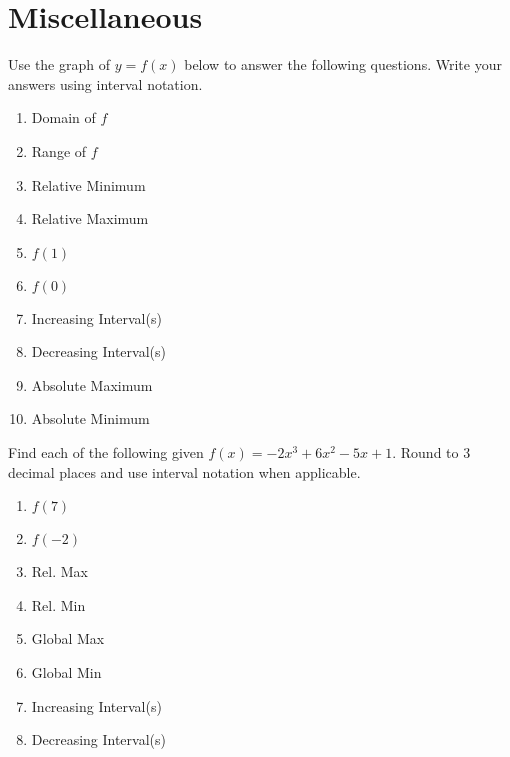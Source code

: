 \section{Miscellaneous}

Use the graph of $y = f(x)$ below to answer the following questions. Write your answers using interval notation.
\begin{center}
\end{center}

\begin{multicols}{2}
\begin{enumerate}
\item Domain of $f$
\item Range of $f$
\item Relative Minimum
\item Relative Maximum
\item $f(1)$
\item $f(0)$
\item Increasing Interval(s)
\item Decreasing Interval(s)
\item Absolute Maximum
\item Absolute Minimum
\setcounter{Review}{\value{enumi}}
\end{enumerate}
\end{multicols}

Find each of the following given $f(x) = -2x^{3}+6x^{2}-5x+1$. Round to 3 decimal places and use interval notation when applicable.
\begin{multicols}{2}
\begin{enumerate}
\setcounter{enumi}{\value{Review}}
\item $f(7)$
\item $f(-2)$
\item Rel. Max
\item Rel. Min
\item Global Max
\item Global Min
\item Increasing Interval(s)
\item Decreasing Interval(s)
\setcounter{Review}{\value{enumi}}
\end{enumerate}
\end{multicols}

